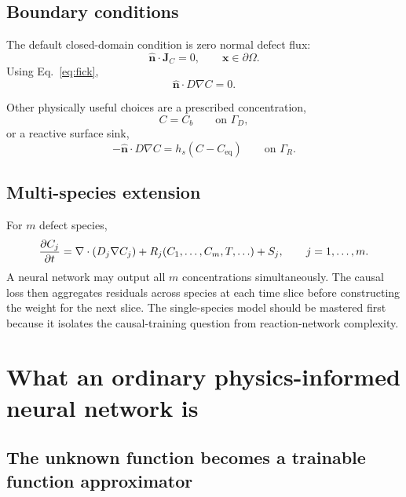\documentclass[11pt]{article}
\newcommand{\xv}{\bm{x}}
\newcommand{\Om}{\Omega}
\begin{document}
\subsection{Boundary conditions}

The default closed-domain condition is zero normal defect flux:
\begin{equation}
\hat{\mathbf n}\cdot\mathbf{J}_C=0,
\qquad
\xv\in\partial\Om.
\end{equation}
Using Eq.~\eqref{eq:fick},
\begin{equation}
\hat{\mathbf n}\cdot D\nabla C=0.
\label{eq:neumann_zero}
\end{equation}

Other physically useful choices are a prescribed concentration,
\begin{equation}
C=C_b
\qquad
\text{on }\Gamma_D,
\label{eq:dirichlet}
\end{equation}
or a reactive surface sink,
\begin{equation}
-\hat{\mathbf n}\cdot D\nabla C
=h_s(C-C_{\mathrm{eq}})
\qquad
\text{on }\Gamma_R.
\label{eq:robin}
\end{equation}

\subsection{Multi-species extension}

For $m$ defect species,
\begin{equation}
\pdv{C_j}{t}
=
\nabla\cdot(D_j\nabla C_j)
+R_j(C_1,\ldots,C_m,T,\ldots)
+S_j,
\qquad
j=1,\ldots,m.
\label{eq:multi_species}
\end{equation}
A neural network may output all $m$ concentrations simultaneously. The causal loss then aggregates residuals across species at each time slice before constructing the weight for the next slice. The single-species model should be mastered first because it isolates the causal-training question from reaction-network complexity.

\section{What an ordinary physics-informed neural network is}

\subsection{The unknown function becomes a trainable function approximator}
\end{document}
